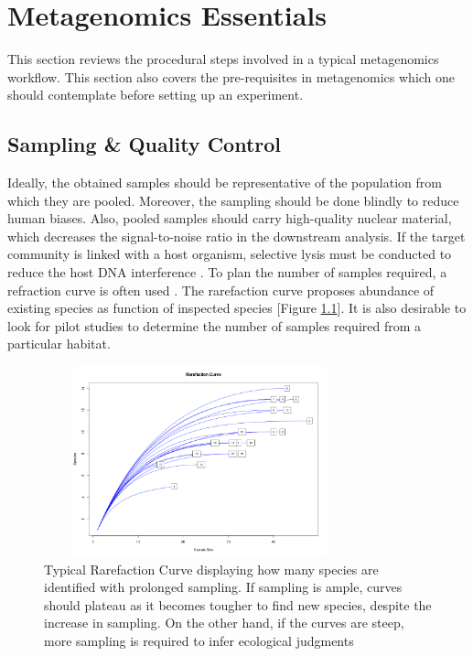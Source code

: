 \chapter{Metagenomics Essentials}
 \setcounter{page}{4}

This section reviews the procedural steps involved in a typical metagenomics workflow. This section also covers the pre-requisites in metagenomics which one should contemplate before setting up an experiment.

\section{Sampling \& Quality Control}
Ideally, the obtained samples should be representative of the population from which they are pooled. Moreover, the sampling should be done blindly to reduce human biases. Also, pooled samples should carry high-quality nuclear material, which decreases the signal-to-noise ratio in the downstream analysis. If the target community is linked with a host organism, selective lysis must be conducted to reduce the host DNA interference \cite{ref11}. To plan the number of samples required, a refraction curve is often used \cite{ref11}. The rarefaction curve proposes abundance of existing species as function of inspected species [Figure \ref{fig:figure1}]. It is also desirable to look for pilot studies to determine the number of samples required from a particular habitat.

\begin{figure}
  \centering
  \includegraphics[width=9cm, height=5.5cm] {../figures/Figure1.png}
  \caption[Typical Rarefaction Curve]{Typical Rarefaction Curve displaying how many species are identified with prolonged sampling. If sampling is ample, curves should plateau as it becomes tougher to find new species, despite the increase in sampling. On the other hand, if the curves are steep, more sampling is required to infer ecological judgments \cite{ref11}}
  \label{fig:figure1}
\end{figure}


